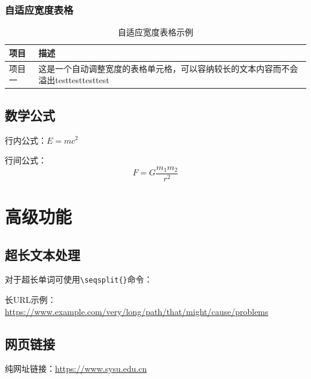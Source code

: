 \documentclass[12pt]{ctexart}
\begin{document}
\begin{sloppypar}
\subsubsection{自适应宽度表格}
\begin{table}[H]
    \centering
    \caption{自适应宽度表格示例}
    \label{tab:adaptive}
    \begin{tabularx}{\textwidth}{|l|X|}  %
        \hline
        \textbf{项目} & \textbf{描述} \\
        \hline
        项目一 & 这是一个自动调整宽度的表格单元格，可以容纳较长的文本内容而不会溢出testtesttesttest \\
        \hline
    \end{tabularx}
\end{table}

\subsection{数学公式}
行内公式：$E=mc^2$

行间公式：
\begin{equation}
    F = G\frac{m_1 m_2}{r^2}
\end{equation}

\section{高级功能}
\subsection{超长文本处理}
对于超长单词可使用\verb|\seqsplit{}|命令：

长URL示例：\url{https://www.example.com/very/long/path/that/might/cause/problems}

\subsection{网页链接}
纯网址链接：\url{https://www.sysu.edu.cn}


\end{sloppypar}
\end{document}
